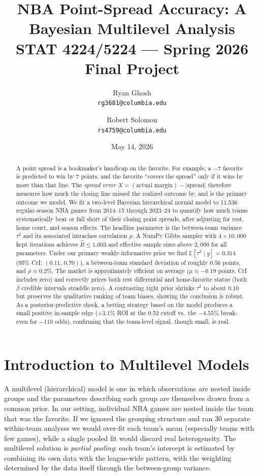 \documentclass[11pt]{article}
\title{\textbf{NBA Point-Spread Accuracy: A Bayesian Multilevel Analysis}\\
       \large STAT 4224/5224 — Spring 2026 Final Project}
\author{Ryan Ghosh \\ \small\texttt{rg3681@columbia.edu}
        \and
        Robert Solomon \\ \small\texttt{rs4759@columbia.edu}}
\date{May 14, 2026}
\newcommand{\E}{\mathbb{E}}
\begin{document}
\maketitle

\begin{abstract}\noindent
A point spread is a bookmaker's handicap on the favorite. For example, a $-7$ favorite is 
predicted to win by $7$ points, and the favorite ``covers the spread'' only if 
it wins by more than that line. The \emph{spread error} 
$X = (\text{actual margin}) - |\text{spread}|$ therefore measures how much the 
closing line missed the realized outcome by, and is the primary outcome we model.
We fit a two-level Bayesian hierarchical normal model to 11{,}536 regular-season
NBA games from 2014--15 through 2023--24 to quantify how much teams
systematically beat or fall short of their closing point spreads, after
adjusting for rest, home court, and season effects. The headline parameter is
the between-team variance $\tau^2$ and its associated intraclass correlation
$\rho$. A NumPy Gibbs sampler with $4 \times 10{,}000$ kept iterations achieves
$\hat R \le 1.003$ and effective sample sizes above $2{,}000$ for all
parameters. Under our primary weakly-informative prior we find $\E[\tau^2 \mid
y] = 0.314$ (95\% CrI: $(0.11,\,0.70)$), a between-team standard deviation of
roughly $0.56$ points, and $\rho \approx 0.2\%$. The market is approximately
efficient on average ($\mu \approx -0.19$ points, CrI includes zero) and
correctly prices both rest differential and home-favorite status (both
$\beta$ credible intervals straddle zero). A contrasting tight prior shrinks
$\tau^2$ to about $0.10$ but preserves the qualitative ranking of team biases,
showing the conclusion is robust. As a posterior-predictive check, a
betting strategy based on the model produces a small positive in-sample edge
($+3.1\%$ ROI at the 0.52 cutoff vs.~the $-4.55\%$ break-even for
$-110$ odds), confirming that the team-level signal, though small, is real.
\end{abstract}

\section{Introduction to Multilevel Models}

A multilevel (hierarchical) model is one in which observations are nested
inside groups and the parameters describing each group are themselves drawn
from a common prior. In our setting, individual NBA games are nested inside
the team that was the favorite. If we ignored the grouping structure and ran
30 separate within-team analyses we would over-fit each team's mean (especially
teams with few games), while a single pooled fit would discard real heterogeneity.
The multilevel solution is \emph{partial pooling}: each team's intercept is
estimated by combining its own data with the league-wide pattern, with the
weighting determined by the data itself through the between-group variance.
\end{document}
